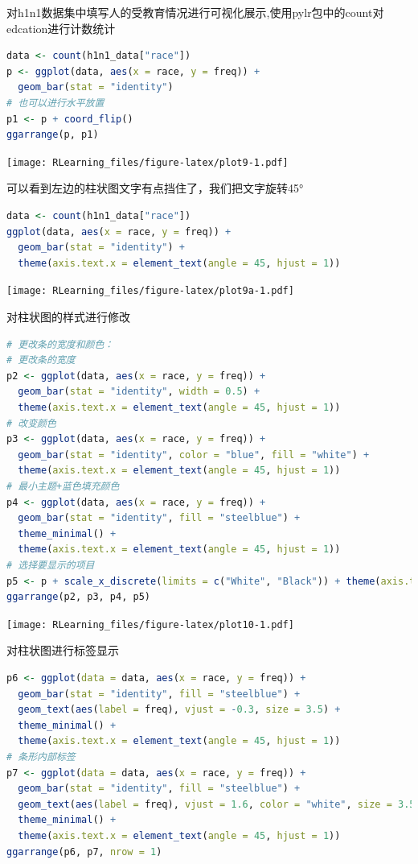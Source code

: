 \documentclass[]{ctexbook}
\begin{document}
对h1n1数据集中填写人的受教育情况进行可视化展示,使用pylr包中的count对edcation进行计数统计

\begin{lstlisting}[language=R]
data <- count(h1n1_data["race"])
p <- ggplot(data, aes(x = race, y = freq)) +
  geom_bar(stat = "identity")
# 也可以进行水平放置
p1 <- p + coord_flip()
ggarrange(p, p1)
\end{lstlisting}

\texttt{[image: RLearning\_files/figure-latex/plot9-1.pdf]}

可以看到左边的柱状图文字有点挡住了，我们把文字旋转45°

\begin{lstlisting}[language=R]
data <- count(h1n1_data["race"])
ggplot(data, aes(x = race, y = freq)) +
  geom_bar(stat = "identity") +
  theme(axis.text.x = element_text(angle = 45, hjust = 1))
\end{lstlisting}

\texttt{[image: RLearning\_files/figure-latex/plot9a-1.pdf]}

对柱状图的样式进行修改

\begin{lstlisting}[language=R]
# 更改条的宽度和颜色：
# 更改条的宽度
p2 <- ggplot(data, aes(x = race, y = freq)) +
  geom_bar(stat = "identity", width = 0.5) +
  theme(axis.text.x = element_text(angle = 45, hjust = 1))
# 改变颜色
p3 <- ggplot(data, aes(x = race, y = freq)) +
  geom_bar(stat = "identity", color = "blue", fill = "white") +
  theme(axis.text.x = element_text(angle = 45, hjust = 1))
# 最小主题+蓝色填充颜色
p4 <- ggplot(data, aes(x = race, y = freq)) +
  geom_bar(stat = "identity", fill = "steelblue") +
  theme_minimal() +
  theme(axis.text.x = element_text(angle = 45, hjust = 1))
# 选择要显示的项目
p5 <- p + scale_x_discrete(limits = c("White", "Black")) + theme(axis.text.x = element_text(angle = 45, hjust = 1))
ggarrange(p2, p3, p4, p5)
\end{lstlisting}

\texttt{[image: RLearning\_files/figure-latex/plot10-1.pdf]}

对柱状图进行标签显示

\begin{lstlisting}[language=R]
p6 <- ggplot(data = data, aes(x = race, y = freq)) +
  geom_bar(stat = "identity", fill = "steelblue") +
  geom_text(aes(label = freq), vjust = -0.3, size = 3.5) +
  theme_minimal() +
  theme(axis.text.x = element_text(angle = 45, hjust = 1))
# 条形内部标签
p7 <- ggplot(data = data, aes(x = race, y = freq)) +
  geom_bar(stat = "identity", fill = "steelblue") +
  geom_text(aes(label = freq), vjust = 1.6, color = "white", size = 3.5) +
  theme_minimal() +
  theme(axis.text.x = element_text(angle = 45, hjust = 1))
ggarrange(p6, p7, nrow = 1)
\end{lstlisting}
\end{document}
